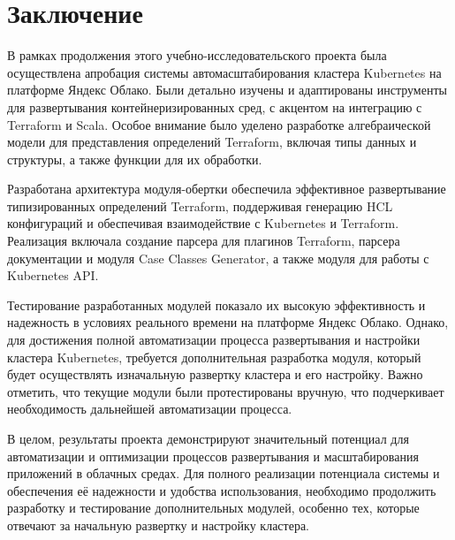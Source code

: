 \chapter*{Заключение}

В рамках продолжения этого учебно-исследовательского проекта была осуществлена
апробация системы автомасштабирования кластера Kubernetes на платформе
Яндекс Облако. Были детально изучены и адаптированы инструменты для
развертывания контейнеризированных сред, с акцентом на интеграцию с Terraform и
Scala. Особое внимание было уделено разработке алгебраической модели для
представления определений Terraform, включая типы данных и структуры, а также
функции для их обработки.

Разработана архитектура модуля-обертки обеспечила эффективное развертывание
типизированных определений Terraform, поддерживая генерацию HCL конфигураций и
обеспечивая взаимодействие с Kubernetes и Terraform. Реализация включала
создание парсера для плагинов Terraform, парсера документации и модуля Case
Classes Generator, а также модуля для работы с Kubernetes API.

Тестирование разработанных модулей показало их высокую эффективность и
надежность в условиях реального времени на платформе Яндекс Облако.
Однако, для достижения полной автоматизации процесса развертывания и настройки
кластера Kubernetes, требуется дополнительная разработка модуля, который будет
осуществлять изначальную развертку кластера и его настройку. Важно отметить, что
текущие модули были протестированы вручную, что подчеркивает необходимость
дальнейшей автоматизации процесса.

В целом, результаты проекта демонстрируют значительный потенциал для
автоматизации и оптимизации процессов развертывания и масштабирования приложений
в облачных средах. Для полного реализации потенциала системы и обеспечения её
надежности и удобства использования, необходимо продолжить разработку и
тестирование дополнительных модулей, особенно тех, которые отвечают за начальную
развертку и настройку кластера.
